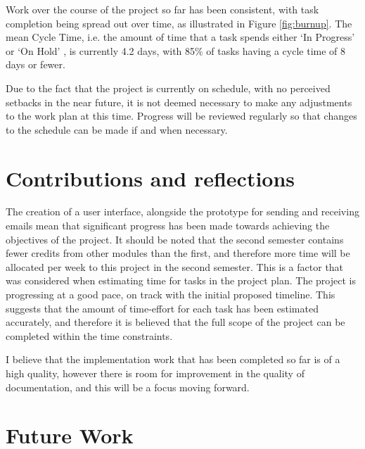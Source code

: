 Work over the course of the project so far has been consistent, with task completion being spread out over time, as illustrated in Figure \ref{fig:burnup}. The mean Cycle Time, i.e. the amount of time that a task spends either `In Progress' or `On Hold' \cite{roock2010kanban}, is currently 4.2 days, with 85\% of tasks having a cycle time of 8 days or fewer.

Due to the fact that the project is currently on schedule, with no perceived setbacks in the near future, it is not deemed necessary to make any adjustments to the work plan at this time. Progress will be reviewed regularly so that changes to the schedule can be made if and when necessary.

\section{Contributions and reflections}

The creation of a user interface, alongside the prototype for sending and receiving emails mean that significant progress has been made towards achieving the objectives of the project. It should be noted that the second semester contains fewer credits from other modules than the first, and therefore more time will be allocated per week to this project in the second semester. This is a factor that was considered when estimating time for tasks in the project plan. The project is progressing at a good pace, on track with the initial proposed timeline. This suggests that the amount of time-effort for each task has been estimated accurately, and therefore it is believed that the full scope of the project can be completed within the time constraints.

I believe that the implementation work that has been completed so far is of a high quality, however there is room for improvement in the quality of documentation, and this will be a focus moving forward.

\section{Future Work}
